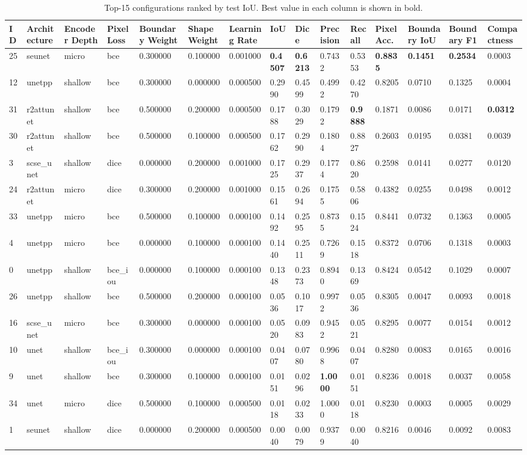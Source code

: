 \begin{table}
\caption{Top-15 configurations ranked by test IoU. Best value in each column is shown in bold.}
\label{tab:results_main}
\begin{tabular}{lllllllllllllll}
\toprule
ID & Architecture & Encoder Depth & Pixel Loss & Boundary Weight & Shape Weight & Learning Rate & IoU & Dice & Precision & Recall & Pixel Acc. & Boundary IoU & Boundary F1 & Compactness \\
\midrule
25 & seunet & micro & bce & 0.300000 & 0.100000 & 0.001000 & \textbf{0.4507} & \textbf{0.6213} & 0.7432 & 0.5353 & \textbf{0.8835} & \textbf{0.1451} & \textbf{0.2534} & 0.0003 \\
12 & unetpp & shallow & bce & 0.300000 & 0.000000 & 0.000500 & 0.2990 & 0.4599 & 0.4992 & 0.4270 & 0.8205 & 0.0710 & 0.1325 & 0.0004 \\
31 & r2attunet & shallow & bce & 0.500000 & 0.200000 & 0.000500 & 0.1788 & 0.3029 & 0.1792 & \textbf{0.9888} & 0.1871 & 0.0086 & 0.0171 & \textbf{0.0312} \\
30 & r2attunet & shallow & bce & 0.500000 & 0.100000 & 0.000500 & 0.1762 & 0.2990 & 0.1804 & 0.8827 & 0.2603 & 0.0195 & 0.0381 & 0.0039 \\
3 & scse_unet & shallow & dice & 0.000000 & 0.200000 & 0.001000 & 0.1725 & 0.2937 & 0.1774 & 0.8620 & 0.2598 & 0.0141 & 0.0277 & 0.0120 \\
24 & r2attunet & micro & dice & 0.300000 & 0.200000 & 0.001000 & 0.1561 & 0.2694 & 0.1755 & 0.5806 & 0.4382 & 0.0255 & 0.0498 & 0.0012 \\
33 & unetpp & micro & bce & 0.500000 & 0.100000 & 0.000100 & 0.1492 & 0.2595 & 0.8735 & 0.1524 & 0.8441 & 0.0732 & 0.1363 & 0.0005 \\
4 & unetpp & micro & bce & 0.000000 & 0.100000 & 0.000100 & 0.1440 & 0.2511 & 0.7269 & 0.1518 & 0.8372 & 0.0706 & 0.1318 & 0.0003 \\
0 & unetpp & shallow & bce_iou & 0.000000 & 0.100000 & 0.000100 & 0.1348 & 0.2373 & 0.8940 & 0.1369 & 0.8424 & 0.0542 & 0.1029 & 0.0007 \\
26 & unetpp & shallow & bce & 0.500000 & 0.200000 & 0.000100 & 0.0536 & 0.1017 & 0.9972 & 0.0536 & 0.8305 & 0.0047 & 0.0093 & 0.0018 \\
16 & scse_unet & micro & bce & 0.300000 & 0.000000 & 0.000100 & 0.0520 & 0.0983 & 0.9452 & 0.0521 & 0.8295 & 0.0077 & 0.0154 & 0.0012 \\
10 & unet & shallow & bce_iou & 0.300000 & 0.000000 & 0.000100 & 0.0407 & 0.0780 & 0.9968 & 0.0407 & 0.8280 & 0.0083 & 0.0165 & 0.0016 \\
9 & unet & shallow & bce & 0.300000 & 0.100000 & 0.000100 & 0.0151 & 0.0296 & \textbf{1.0000} & 0.0151 & 0.8236 & 0.0018 & 0.0037 & 0.0058 \\
34 & unet & micro & dice & 0.500000 & 0.100000 & 0.000500 & 0.0118 & 0.0233 & 1.0000 & 0.0118 & 0.8230 & 0.0003 & 0.0005 & 0.0029 \\
1 & seunet & shallow & dice & 0.000000 & 0.200000 & 0.000500 & 0.0040 & 0.0079 & 0.9379 & 0.0040 & 0.8216 & 0.0046 & 0.0092 & 0.0083 \\
\bottomrule
\end{tabular}
\end{table}
